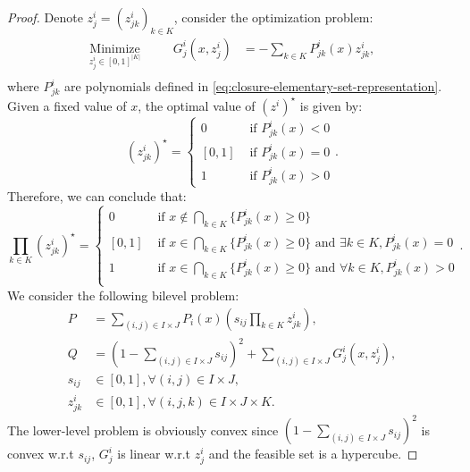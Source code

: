 \documentclass{article}
\theoremstyle{plain}
\theoremstyle{definition}
\begin{document}
\begin{proof}
    Denote $z^i_j = (z^i_{jk})_{k \in K}$, consider the optimization problem:
    \begin{equation*}
        \begin{aligned}
            \underset{z^i_j \in [0,1]^{|K|}}{\text{Minimize}} \quad && G^i_j(x,z^i_j) & = - \sum_{k \in K} P^i_{jk}(x)z^i_{jk},\\
        \end{aligned}
    \end{equation*}
    where $P_{jk}^i$ are polynomials defined in \eqref{eq:closure-elementary-set-representation}. Given a fixed value of $x$, the optimal value of $(z^i)^\star$ is given by:
    \begin{equation*}
        (z_{jk}^i)^\star = \begin{cases}
            0 & \text{ if } P_{jk}^i(x) < 0\\
            [0,1] & \text{ if } P_{jk}^i(x) = 0\\
            1 & \text{ if } P_{jk}^i(x) > 0
        \end{cases}.
    \end{equation*}
    Therefore, we can conclude that:
    \begin{equation}
        \label{eq:optimized-product-z-i}
        \prod_{k \in K} (z_{jk}^i)^\star = \begin{cases}
            0 & \text{ if } x \notin \bigcap_{k \in K} \{P^i_{jk}(x) \geq 0\}\\
            [0,1] & \text{ if } x \in \bigcap_{k \in K} \{P^i_{jk}(x) \geq 0\} \text{ and } \exists k \in K, P_{jk}^i(x) = 0\\
            1 & \text{ if } x \in \bigcap_{k \in K} \{P^i_{jk}(x) \geq 0\} \text{ and } \forall k \in K, P_{jk}^i(x) > 0\\
        \end{cases}.
    \end{equation}
    We consider the following bilevel problem:
    \begin{equation}
        \label{eq:bilevel-construction-convex-bounded}
        \begin{aligned}
            P &= \sum_{(i,j) \in I \times J} P_i(x)\left(s_{ij}\prod_{k \in K} z_{jk}^i\right),\\
            Q &= (1 - \sum_{(i,j) \in I \times J} s_{ij})^2 + \sum_{(i,j) \in I \times J} G^i_j(x,z^i_j),\\
            s_{ij} & \in [0,1], \forall (i,j) \in I \times J,\\
            z_{jk}^i & \in [0,1], \forall (i,j,k) \in I \times J \times K.  
        \end{aligned}
    \end{equation}
    The lower-level problem is obviously convex since $(1 - \sum_{(i,j) \in I \times J} s_{ij})^2$ is convex w.r.t $s_{ij}$, $G^i_j$ is linear w.r.t $z_j^i$ and the feasible set is a hypercube.
    

\end{proof}
\end{document}
